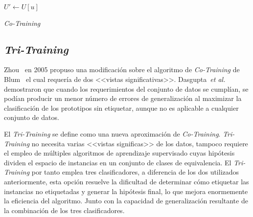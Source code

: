 \begin{algorithm}[H]
  	\BlankLine
  	$U' \leftarrow U[u]$\\
	\caption{\textit{Co-Training}}\label{alg:Co-Training}
\end{algorithm}

\subsection{\textit{Tri-Training}}
Zhou~\cite{zhou2005tri} en 2005 propuso una modificación sobre el algoritmo de \textit{Co-Training} de Blum~\cite{blum1998combining} el cual requería de dos <<vistas significativas>>. Dasgupta~\textit{et al.}~\cite{dasgupta2002pac} demostraron que cuando los requerimientos del conjunto de datos se cumplían, se podían producir un menor número de errores de generalización al maximizar la clasificación de los prototipos sin etiquetar, aunque no es aplicable a cualquier conjunto de datos.

El \textit{Tri-Training} se define como una nueva aproximación de \textit{Co-Training}. \textit{Tri-Training} no necesita varias <<vistas significas>> de los datos, tampoco requiere el empleo de múltiples algoritmos de aprendizaje supervisado cuyas hipótesis dividen el espacio de instancias en un conjunto de clases de equivalencia. El \textit{Tri-Training} por tanto emplea tres clasificadores, a diferencia de los dos utilizados anteriormente, esta opción resuelve la dificultad de determinar cómo etiquetar las instancias no etiquetadas y generar la hipótesis final, lo que mejora enormemente la eficiencia del algoritmo. Junto con la capacidad de generalización resultante de la combinación de los tres clasificadores.

